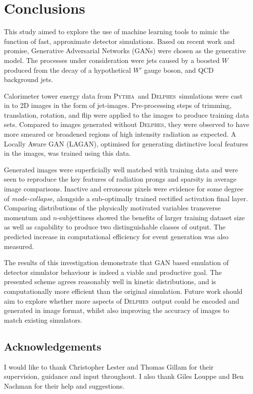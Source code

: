 \documentclass[twocolumn]{article}
\newcommand{\pkg}[1]{\textsc{#1}}
\newcommand{\pythia}{\pkg{Pythia}}
\newcommand{\delphes}{\pkg{Delphes}}
\begin{document}
\section{Conclusions}
\label{sec:conclusions}
This study aimed to explore the use of machine learning tools to mimic the function of fast, approximate detector simulations. Based on recent work and promise, Generative Adversarial Networks (GANs) were chosen as the generative model. The processes under consideration were jets caused by a boosted $W$ produced from the decay of a hypothetical $W'$ gauge boson, and QCD background jets. 

Calorimeter tower energy data from \pythia~and \delphes~simulations were cast in to 2D images in the form of jet-images. Pre-processing steps of trimming, translation, rotation, and flip were applied to the images to produce training data sets. Compared to images generated without \delphes, they were observed to have more smeared or broadened regions of high intensity radiation as expected. A Locally Aware GAN (LAGAN), optimised for generating distinctive local features in the images, was trained using this data. 

Generated images were superficially well matched with training data and were seen to reproduce the key features of radiation prongs and sparsity in average image comparisons. Inactive and erroneous pixels were evidence for some degree of \textit{mode-collapse}, alongside a sub-optimally trained rectified activation final layer. Comparing distributions of the physically motivated variables transverse momentum and $n$-subjettiness showed the benefits of larger training dataset size as well as capability to produce two distinguishable classes of output. The predicted increase in computational efficiency for event generation was also measured. 

The results of this investigation demonstrate that GAN based emulation of detector simulator behaviour is indeed a viable and productive goal. The presented scheme agrees reasonably well in kinetic distributions, and is computationally more efficient than the original simulation. Future work should aim to explore whether more aspects of \delphes~output could be encoded and generated in image format, whilst also improving the accuracy of images to match existing simulators. 

\subsection*{Acknowledgements}
I would like to thank Christopher Lester and Thomas Gillam for their supervision, guidance and input throughout. I also thank Giles Louppe and Ben Nachman for their help and suggestions.  
\onecolumn


\begin{appendices}


\end{appendices}

\printbibliography[title=References]
\end{document}
